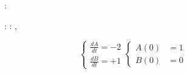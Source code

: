 \begin{figure}[t]

\begin{minipage}[t]{\linewidth}

{\centering 

\begin{Shaded}
\begin{Highlighting}[]
\end{Highlighting}
\end{Shaded}

}

\end{minipage}%
\newline
\begin{minipage}[t]{\linewidth}

{\centering 

\begin{minipage}[c]{0.60\linewidth}

{\centering 

\begin{Shaded}
\begin{Highlighting}[]
\KeywordTok{(}\KeywordTok{)}:

: \OperatorTok{=}\KeywordTok{(}\OperatorTok{=}\KeywordTok{)}
: \OperatorTok{=}\KeywordTok{(}\OperatorTok{=}\KeywordTok{)}
\OperatorTok{=}\KeywordTok{(}
\OperatorTok{=}\KeywordTok{[} \OperatorTok{*}\KeywordTok{]},
\OperatorTok{=}\NormalTok{\KeywordTok{[}B\KeywordTok{]},}
\OperatorTok{=}\NormalTok{,}
\KeywordTok{    )}
\end{Highlighting}
\end{Shaded}

}

\end{minipage}%
%
\begin{minipage}[c]{0.40\linewidth}

{\centering 

\[
\begin{cases}
    \frac{dA}{dt} = -2 \\
    \frac{dB}{dt} = +1
\end{cases}
\begin{cases}
    A(0) &= 1 \\
    B(0) &= 0
\end{cases}
\]

}
\end{minipage}}
\end{minipage}
\end{figure}
